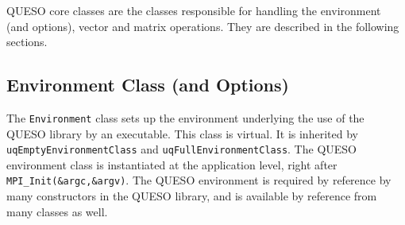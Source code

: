 QUESO core classes are the classes responsible for handling the environment (and options), vector
and matrix operations. They are described in the following sections.

% 
% 
% 
% 
% 
% 


\subsection{Environment Class (and Options)}\label{sec:environment_class}

%
The \texttt{Environment} class sets up the environment underlying the use of the QUESO library by an executable.
This class is virtual. It is inherited by \verb+uqEmptyEnvironmentClass+ and \verb+uqFullEnvironmentClass+.
    The QUESO environment class is instantiated at the application level, right after \verb+MPI_Init(&argc,&argv)+. 
    The QUESO environment is required by reference by many constructors in the QUESO library, and is available by reference from many classes as well.

